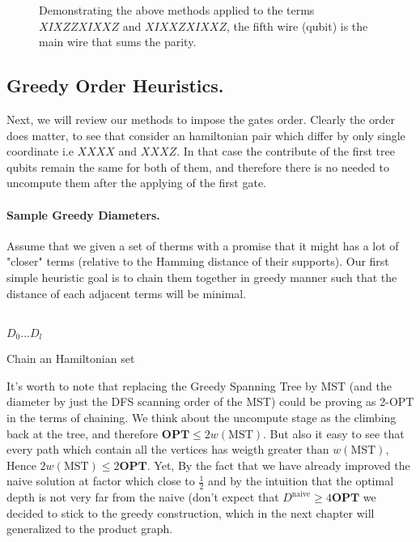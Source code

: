 \documentclass{article}
\begin{document}
\begin{figure*}[h]
    
    \caption{ Demonstrating the above methods applied to the terms \( XIXZZXIXXZ \) and \( XIXXZXIXXZ \), the fifth wire (qubit) is the main wire that sums the parity.}
    \label{fig:average-data-vs-model}
\end{figure*}
\begin{multicols}{2}

\section{Greedy Order Heuristics.}
Next, we will review our methods to impose the gates order. Clearly the order does matter, to see that consider an hamiltonian pair which differ by only single coordinate i.e \(XXXX\) and \(XXXZ\). In that case the contribute of the first tree qubits remain the same for both of them, and therefore there is no needed to uncompute them after the applying of the first gate.      
\paragraph{Sample Greedy Diameters.} Assume that we given a set of therms with a promise that it might has a lot of "closer" terms (relative to the Hamming distance of their supports). Our first simple heuristic goal is to chain them together in greedy manner such that the distance of each adjacent terms will be minimal. 


\begin{algorithm}[H]
\SetAlgoLined
\ \\ 
\Return \(D_{0} ... D_{l}\) 
 \caption{Chain an Hamiltonian set }
\end{algorithm}
It's worth to note that replacing the Greedy Spanning Tree by MST (and the diameter by just the DFS scanning order of the MST) could be proving as 2-OPT in the terms of chaining. We think about the uncompute stage as the climbing back at the tree, and therefore \( \textbf{OPT} \le 2w\left(\text{MST} \right) \). But also it easy to see that every path which contain all the vertices has weigth greater than \(w\left(\text{MST} \right) \), Hence  \(2w\left(\text{MST} \right) \le 2\textbf{OPT}\).          
Yet, By the fact that we have already improved the naive solution at factor which close to \(\frac{1}{2}\) and by the intuition that the optimal depth is not very far from the naive (don't expect that \( D^{\text{naive}} \ge 4 \textbf{OPT} \) we decided to stick to the greedy construction, which in the next chapter will generalized to the product graph. 


\end{multicols}
\end{document}
